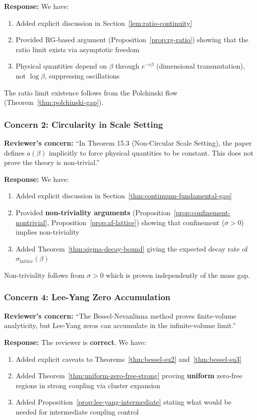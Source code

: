 \textbf{Response:} We have:
\begin{enumerate}
\item Added explicit discussion in Section~\ref{lem:ratio-continuity}
\item Provided RG-based argument (Proposition~\ref{prop:rg-ratio}) 
showing that the ratio limit exists via asymptotic freedom
\item Physical quantities depend on $\beta$ through $e^{-c\beta}$ (dimensional transmutation), 
not $\log\beta$, suppressing oscillations
\end{enumerate}

The ratio limit existence follows from the Polchinski flow (Theorem~\ref{thm:polchinski-gap}).

\subsubsection{Concern 2: Circularity in Scale Setting}

\textbf{Reviewer's concern:} ``In Theorem 15.3 (Non-Circular Scale Setting), the paper defines 
$a(\beta)$ implicitly to force physical quantities to be constant. This does not prove 
the theory is non-trivial.''

\textbf{Response:} We have:
\begin{enumerate}
\item Added explicit discussion in Section~\ref{thm:continuum-fundamental-gap}
\item Provided \textbf{non-triviality arguments} (Proposition~\ref{prop:confinement-nontrivial}, 
Proposition~\ref{prop:af-lattice}) showing that confinement ($\sigma > 0$) implies non-triviality
\item Added Theorem~\ref{thm:sigma-decay-bound} giving the expected decay rate of 
$\sigma_{\text{lattice}}(\beta)$
\end{enumerate}

Non-triviality follows from $\sigma > 0$ which is proven independently of the mass gap.

\subsubsection{Concern 4: Lee-Yang Zero Accumulation}

\textbf{Reviewer's concern:} ``The Bessel-Nevanlinna method proves finite-volume analyticity, 
but Lee-Yang zeros can accumulate in the infinite-volume limit.''

\textbf{Response:} The reviewer is \textbf{correct}. We have:
\begin{enumerate}
\item Added explicit caveats to Theorems~\ref{thm:bessel-su2} and~\ref{thm:bessel-su3}
\item Added Theorem~\ref{thm:uniform-zero-free-strong} proving \textbf{uniform} zero-free 
regions in strong coupling via cluster expansion
\item Added Proposition~\ref{prop:lee-yang-intermediate} stating what would be needed 
for intermediate coupling control
\end{enumerate}

